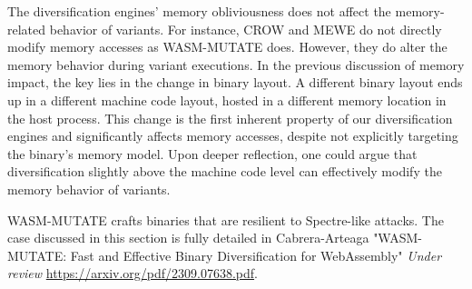 \begin{tcolorbox}[title=Reflection,boxrule=1pt,arc=.2em,boxsep=1.0mm]

    The diversification engines' memory obliviousness does not affect the memory-related behavior of \Wasm variants. 
    For instance, CROW and MEWE do not directly modify memory accesses as WASM-MUTATE does. 
    However, they do alter the memory behavior during variant executions. 
    In the previous discussion of memory impact, the key lies in the change in \Wasm binary layout. 
    A different \Wasm binary layout ends up in a different machine code layout, hosted in a different memory location in the host process.
    This change is the first inherent property of our diversification engines and significantly affects memory accesses, despite not explicitly targeting the \Wasm binary's memory model. 
    Upon deeper reflection, one could argue that diversification slightly above the machine code level can effectively modify the memory behavior of variants.

\end{tcolorbox}




\begin{tcolorbox}[title=Contribution paper,boxrule=1pt,arc=.2em,boxsep=1.0mm]
    WASM-MUTATE crafts \Wasm binaries that are resilient to Spectre-like attacks. 
    The case discussed in this section is fully detailed in Cabrera-Arteaga \etal "WASM-MUTATE: Fast and Effective Binary Diversification for WebAssembly"
    \emph{Under review}
    \url{https://arxiv.org/pdf/2309.07638.pdf}. 
\end{tcolorbox}



